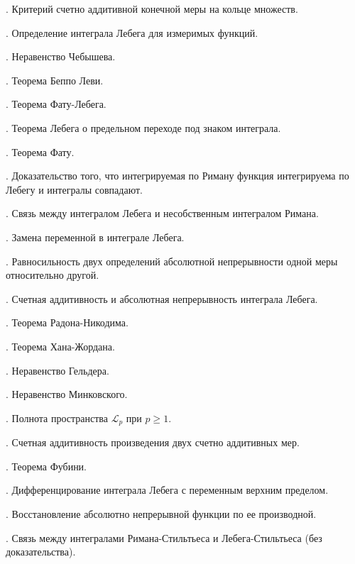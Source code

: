 \documentclass[12pt,titlepage]{article}
\theoremstyle{definition}
\begin{document}
. Критерий счетно аддитивной конечной меры на кольце
множеств.

. Определение интеграла Лебега для измеримых функций.

. Неравенство Чебышева.

. Теорема Беппо Леви.

. Теорема Фату-Лебега.

. Теорема Лебега о предельном переходе под знаком
интеграла.

. Теорема Фату.

. Доказательство того, что интегрируемая по Риману
функция интегрируема по Лебегу и интегралы совпадают.

. Связь между интегралом Лебега и несобственным
интегралом Римана.

. Замена переменной в интеграле Лебега.

. Равносильность двух определений абсолютной
непрерывности одной меры относительно другой.

. Счетная аддитивность и абсолютная непрерывность
интеграла Лебега.

. Теорема Радона-Никодима.

. Теорема Хана-Жордана.

. Неравенство Гельдера.

. Неравенство Минковского.

. Полнота пространства $\mathcal{L}_p$ при $p\geqslant
1$.

. Счетная аддитивность произведения двух счетно
аддитивных мер.

. Теорема Фубини.

. Дифференцирование интеграла Лебега с переменным
верхним пределом.

. Восстановление абсолютно непрерывной функции по ее
производной.

. Связь между интегралами Римана-Стильтьеса и
Лебега-Стильть\-еса (без доказательства).
\end{document}
